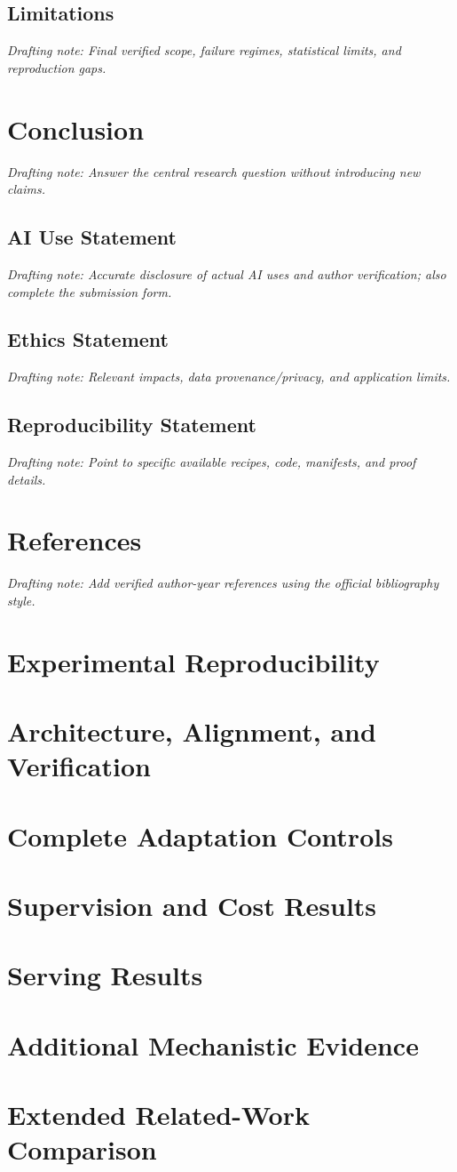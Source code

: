 \documentclass[letterpaper]{article}
\newcommand{\draftnote}[1]{\par\noindent\textit{Drafting note: #1}\par}
\begin{document}
\subsection{Limitations}
\draftnote{Final verified scope, failure regimes, statistical limits, and reproduction gaps.}

\section{Conclusion}
\label{sec:conclusion}
\draftnote{Answer the central research question without introducing new claims.}

\subsection*{AI Use Statement}
\draftnote{Accurate disclosure of actual AI uses and author verification; also complete the submission form.}
\subsection*{Ethics Statement}
\draftnote{Relevant impacts, data provenance/privacy, and application limits.}
\subsection*{Reproducibility Statement}
\draftnote{Point to specific available recipes, code, manifests, and proof details.}

% 
% 
\section*{References}
\draftnote{Add verified author-year references using the official bibliography style.}

\clearpage
\appendix
\section{Experimental Reproducibility}
\section{Architecture, Alignment, and Verification}
\section{Complete Adaptation Controls}
\section{Supervision and Cost Results}
\section{Serving Results}
\section{Additional Mechanistic Evidence}
\section{Extended Related-Work Comparison}
\end{document}

